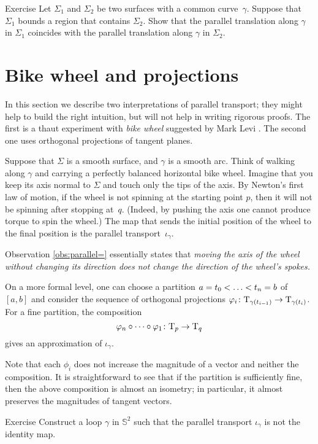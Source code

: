 \begin{thm}{Exercise}\label{ex:parallel-transport-support}
Let $\Sigma_1$ and $\Sigma_2$ be two surfaces with a common curve~$\gamma$.
Suppose that $\Sigma_1$ bounds a region that contains $\Sigma_2$.
Show that the parallel translation along $\gamma$ in $\Sigma_1$ 
coincides with the parallel translation along $\gamma$ in $\Sigma_2$. 
\end{thm}

\section{Bike wheel and projections}

In this section we describe two interpretations of parallel transport;
they might help to build the right intuition, but will not help in writing rigorous proofs.
The first is a thaut experiment with {}\emph{bike wheel} suggested by Mark Levi \cite{levi}.
The second one uses orthogonal projections of tangent planes.

Suppose that $\Sigma$ is a smooth surface, and $\gamma$ is a smooth arc.
Think of walking along $\gamma$ and carrying a perfectly balanced horizontal bike wheel.
Imagine that you keep its axis normal to $\Sigma$ and touch only the tips of the axis.
By Newton's first law of motion, if the wheel is not spinning at the starting point $p$, then it will not be spinning after stopping at~$q$.
(Indeed, by pushing the axis one cannot produce torque to spin the wheel.)
The map that sends the initial position of the wheel to the final position is  the parallel transport~$\iota_\gamma$.

Observation \ref{obs:parallel=} essentially states that {}\emph{moving the axis of the wheel without changing its direction does not change the direction of the wheel's spokes.}

On a more formal level, one can choose a partition $a=t_0<\dots\z<t_n=b$ of $[a,b]$
and consider the sequence of orthogonal projections $\varphi_i\colon\mathrm{T}_{\gamma(t_{i-1})}\to\mathrm{T}_{\gamma(t_i)}$.
For a fine partition, the composition 
\[\phi_n\circ\dots\circ\phi_1\:\T_p\z\to\T_q\]
gives an approximation of $\iota_\gamma$.

Note that each $\phi_i$ does not increase the magnitude of a vector and neither the composition.
It is straightforward to see that if the partition is sufficiently fine, then the above composition is almost an isometry; in particular, it almost preserves the magnitudes of tangent vectors.

\begin{thm}{Exercise}\label{ex:holonomy=not0}
Construct a loop $\gamma$ in $\mathbb{S}^2$ such that the parallel transport $\iota_\gamma$ is not the identity map.
\end{thm}

